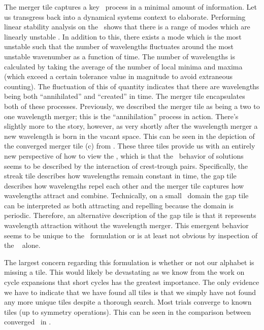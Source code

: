 The merger tile captures a key \spt\ process in a minimal amount
of information. Let us transgress back into
a dynamical systems context to elaborate.
Performing linear stability analysis on the \KSe\ shows
that there is a range of modes which are linearly unstable
.
In addition to this, there exists a mode which is the most unstable
such that the number of wavelengths fluctuates around the most
unstable wavenumber as a function of time.
The number of wavelengths is calculated by
taking the average of the number of
local minima and maxima (which exceed a certain tolerance
value in magnitude to avoid extraneous counting).
The fluctuation of this of quantity indicates that there are
wavelengths being both ``annihilated'' and ``created'' in time.
The merger tile encapsulates both of these processes.
Previously, we described
the merger tile as being a two to one wavelength merger;
this is the ``annihilation'' process in action. There's slightly more
to the story, however, as very shortly after the wavelength merger a
new wavelength is born in the vacant space. This can
be seen in the depiction of the converged merger tile (c) from
.
These three tiles provide us with an entirely new
perspective of how to view the \KSe, which is that the
\spt\ behavior of solutions seems to be described by
the interaction of crest-trough pairs.
Specifically, the streak tile describes
how wavelengths remain constant in time,
the gap tile describes how wavelengths repel each other
and the merger tile captures how wavelengths attract
and combine. Technically,
on a small \spt\ domain the gap tile can be interpreted as
both attracting and repelling because the domain is periodic.
Therefore, an alternative description of the gap tile is
that it represents wavelength attraction without the
wavelength merger.
This emergent behavior seems to be unique to the \spt\
formulation or is at least
not obvious by inspection of the \KSe\  alone.

The largest concern regarding this formulation is
whether or not our alphabet is missing a tile.
This would likely be devastating as we know from
the work on cycle expansions that short cycles has the greatest
importance.
The only evidence we have to indicate that we have
found all tiles is that we simply have not found any more unique
tiles despite a thorough search.
Most trials converge to known tiles (up to symmetry operations).
This can be seen in the comparison between converged \twots\ in
.

